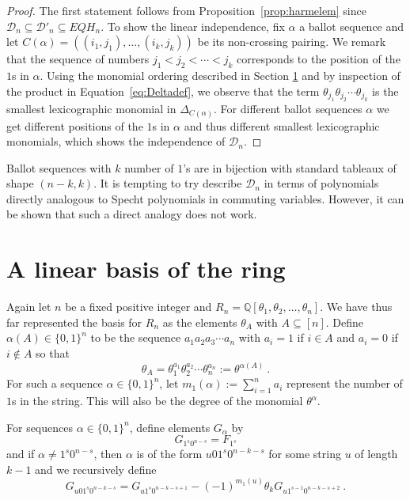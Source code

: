 \documentclass[submission]{FPSAC2023}
\theoremstyle{definition}
\numberwithin{equation}{section}
\begin{document}
\begin{proof}
  The first statement follows from Proposition~\ref{prop:harmelem} since ${\mathcal D}_n \subseteq {\mathcal D}'_n \subseteq EQH_n$.
To show the linear independence, fix $\alpha$ a ballot sequence and let $C(\alpha)=((i_1,j_1),\ldots,(i_k,j_k))$ be its non-crossing pairing.  We remark that the sequence of numbers
$j_1<j_2<\cdots<j_k$ corresponds to the position of the $1$s in $\alpha$.
Using the monomial ordering described in Section \ref{sec:linbasis}
and by inspection of the product in Equation~\eqref{eq:Deltadef},
we observe that the term $\theta_{j_1}\theta_{j_2}\cdots\theta_{j_k}$ is the smallest lexicographic
monomial in $\Delta_{C(\alpha)}$.
For different ballot sequences $\alpha$ we get different positions of the $1$s in
$\alpha$ and thus different smallest lexicographic monomials,
which shows the independence of ${\mathcal D}_n$.
\end{proof}

Ballot sequences with $k$ number of $1$'s are in bijection with standard tableaux of shape $(n-k,k)$. It is tempting to try describe $\mathcal{D}_{n}$ in terms of polynomials directly analogous to Specht polynomials in commuting variables. However, it can be shown that such a direct analogy does not work.

\section{A linear basis of the ring}\label{sec:linbasis}

Again let $n$ be a fixed positive integer and $R_n = {\mathbb Q}[\theta_1, \theta_2, \ldots, \theta_n]$.
We have thus far represented the basis for
$R_n$ as the elements $\theta_A$ with $A \subseteq [n]$.  Define $\alpha(A) \in \{ 0,1\}^n$ to be
the sequence $a_1 a_2 a_3 \cdots a_n$ with $a_i = 1$ if $i \in A$ and
$a_i = 0$ if $i \notin A$ so that
\[
\theta_A = \theta_1^{a_1} \theta_2^{a_2} \cdots \theta_n^{a_n} := \theta^{\alpha(A)}~.
\]
For such a sequence $\alpha \in \{0,1\}^n$, let $m_1(\alpha) := \sum_{i=1}^n a_i$
represent the number of $1$s in the string.  This will also be the degree of the monomial
$\theta^{\alpha}$.

For sequences $\alpha \in \{ 0, 1 \}^n$, define elements $G_\alpha$ by
\begin{equation}\label{eq:Gdef1}
G_{1^s0^{n-s}} = F_{1^s}
\end{equation}
and if $\alpha \neq 1^s 0^{n-s}$, then $\alpha$ is of the form $u01^s0^{n-k-s}$ for some string $u$
of length $k-1$ and we recursively define
\begin{equation}\label{eq:Gdef2}
G_{u01^s0^{n-k-s}} = G_{u1^s0^{n-k-s+1}} - (-1)^{m_1(u)} \theta_k G_{u1^{s-1}0^{n-k-s+2}}~.
\end{equation}
\end{document}
